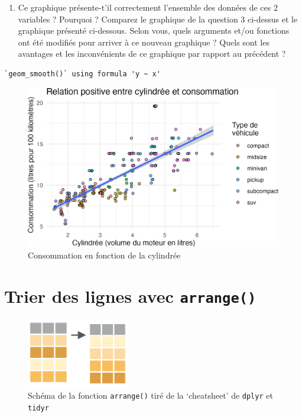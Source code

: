 \documentclass[
  letterpaper,
  DIV=11,
  numbers=noendperiod]{scrreprt}
\providecommand{\tightlist}{%
  \setlength{\itemsep}{0pt}\setlength{\parskip}{0pt}}\usepackage{longtable,booktabs,array}
\begin{document}
\begin{enumerate}
\def\labelenumi{\arabic{enumi}.}
\setcounter{enumi}{3}
\tightlist
\item
  Ce graphique présente-t'il correctement l'ensemble des données de ces
  2 variables ? Pourquoi ? Comparez le graphique de la question 3
  ci-dessus et le graphique présenté ci-dessous. Selon vous, quels
  arguments et/ou fonctions ont été modifiés pour arriver à ce nouveau
  graphique ? Quels sont les avantages et les inconvénients de ce
  graphique par rapport au précédent ?
\end{enumerate}

\begin{verbatim}
`geom_smooth()` using formula 'y ~ x'
\end{verbatim}

\begin{figure}

{\centering \includegraphics{./04-DataWrangling_files/figure-pdf/consommation2-1.png}

}

\caption{Consommation en fonction de la cylindrée}

\end{figure}

\hypertarget{arrange}{%
\section{\texorpdfstring{Trier des lignes avec
\texttt{arrange()}}{Trier des lignes avec arrange()}}\label{arrange}}

\begin{figure}

{\centering \includegraphics[width=0.4\textwidth,height=\textheight]{./images/arrange.png}

}

\caption{Schéma de la fonction \texttt{arrange()} tiré de la
`cheatsheet' de \texttt{dplyr} et \texttt{tidyr}}

\end{figure}
\end{document}
